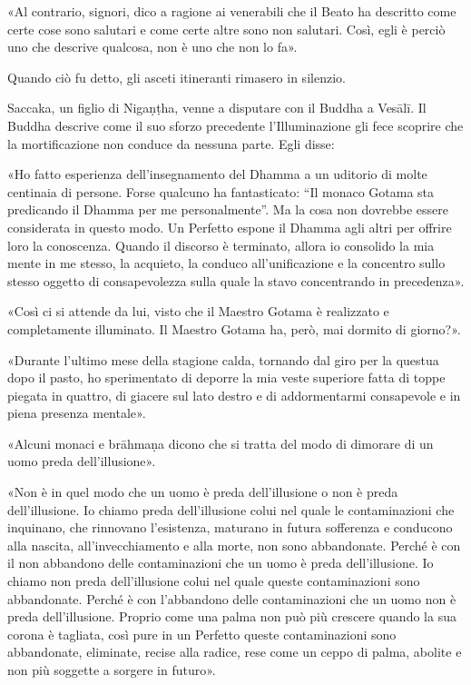 «Al contrario, signori, dico a ragione ai venerabili che il Beato ha descritto
come certe cose sono salutari e come certe altre sono non salutari. Così, egli è
perciò uno che descrive qualcosa, non è uno che non lo fa».

Quando ciò fu detto, gli asceti itineranti rimasero in silenzio.


 Saccaka, un figlio di Nigaṇṭha, venne a disputare
con il Buddha a Vesālī. Il Buddha descrive come il suo sforzo precedente
l’Illuminazione gli fece scoprire che la mortificazione non conduce da nessuna
parte. Egli disse:

 «Ho fatto esperienza dell’insegnamento del Dhamma a un
uditorio di molte centinaia di persone. Forse qualcuno ha fantasticato: “Il
monaco Gotama sta predicando il Dhamma per me personalmente”. Ma la cosa non
dovrebbe essere considerata in questo modo. Un Perfetto espone il Dhamma agli
altri per offrire loro la conoscenza. Quando il discorso è terminato, allora io
consolido la mia mente in me stesso, la acquieto, la conduco all’unificazione e
la concentro sullo stesso oggetto di consapevolezza sulla quale la stavo
concentrando in precedenza».

«Così ci si attende da lui, visto che il Maestro Gotama è realizzato e
completamente illuminato. Il Maestro Gotama ha, però, mai dormito di giorno?».

«Durante l’ultimo mese della stagione calda, tornando dal giro per la questua
dopo il pasto, ho sperimentato di deporre la mia veste superiore fatta di toppe
piegata in quattro, di giacere sul lato destro e di addormentarmi consapevole e
in piena presenza mentale».

«Alcuni monaci e brāhmaṇa dicono che si tratta del modo di dimorare di un uomo
preda dell’illusione».

«Non è in quel modo che un uomo è preda dell’illusione o non è preda
dell’illusione. Io chiamo preda dell’illusione colui nel quale le contaminazioni
che inquinano, che rinnovano l’esistenza, maturano in futura sofferenza e
conducono alla nascita, all’invecchiamento e alla morte, non sono abbandonate.
Perché è con il non abbandono delle contaminazioni che un uomo è preda
dell’illusione. Io chiamo non preda dell’illusione colui nel quale queste
contaminazioni sono abbandonate. Perché è con l’abbandono delle contaminazioni
che un uomo non è preda dell’illusione. Proprio come una palma non può più
crescere quando la sua corona è tagliata, così pure in un Perfetto queste
contaminazioni sono abbandonate, eliminate, recise alla radice, rese come un
ceppo di palma, abolite e non più soggette a sorgere in futuro».

